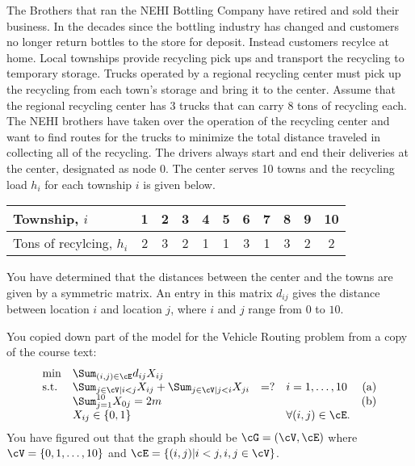 \newpage

 The Brothers that ran the NEHI Bottling Company have retired and sold their business. In the decades since the bottling industry has changed and customers no longer return bottles to the store for deposit. Instead customers recylce at home. Local townships provide recycling pick ups and transport the recycling to temporary storage. Trucks operated by a regional recycling center must pick up the recycling from each town's storage and bring it to the center. Assume that the regional recycling center has 3 trucks that can carry 8 tons of recycling each. The NEHI brothers have taken over the operation of the recycling center and want to find routes for the trucks to minimize the total distance traveled in collecting all of the recycling. The drivers always start and end their deliveries at the center, designated as node 0.  The center serves 10 towns and the recycling load $h_i$ for each township $i$ is given below. 


\begin{center}
\begin{tabular}{|l||c|c|c|c|c|c|c|c|c|c|} \hline
Township, $i$ 
&  1	&	2	&	3	&	4	&     5	&	6	&	7	&	8	&   9    &     10
\\
\hline
Tons of recylcing, $h_i$ 
&   2	&	3	&	2	&	1	&	1	&	3	&	1	&	3	&    2   &   2 \\\hline
\end{tabular}
\end{center}

You have determined that the distances between the center and the towns are given by a symmetric matrix.  An entry in this matrix $d_{ij}$ 
gives the distance between location $i$ and location $j$, where $i$ and $j$ range from $0$ to $10$.

You copied down part of the model for the Vehicle Routing problem from a copy of the course text:
\[
\begin{array}{llllr}
  \min & \Sum_{(i,j) \in \cE} d_{ij} X_{ij} & \\
\mbox{s.t.} & \Sum_{j \in \cV | i < j} X_{ij} + \Sum_{j \in \cV |j<i} X_{ji} & = ? & i =
1,\ldots,10 & (\rm{a}) \\
&  \Sum_{j=1}^{10} X_{0j}  = 2m & & & (\rm{b}) \\
& X_{ij} \in \{0,1\} & & \forall (i,j) \in \cE. &
\end{array}
\]
You have figured out that the graph should be $\cG = (\cV,\cE)$ where $\cV
= \{0,1,\ldots,10\}$ and $\cE = \{ (i,j) | i < j, i,j \in \cV\}$.  

